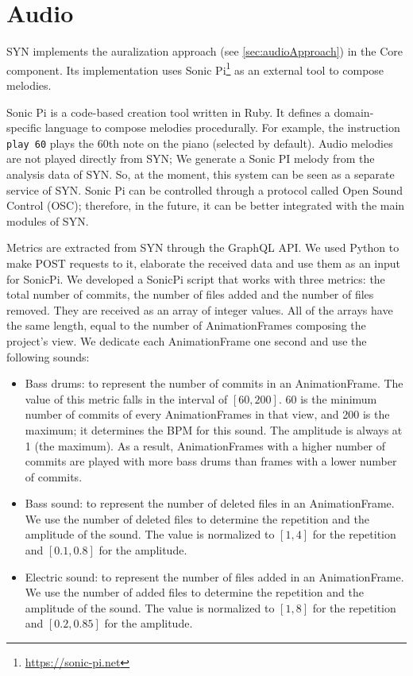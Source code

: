 \section{Audio}
SYN implements the auralization approach (see \autoref{sec:audioApproach}) in the Core component. 
Its implementation uses Sonic Pi\footnote{\url{https://sonic-pi.net}} as an external tool to compose melodies.

Sonic Pi is a code-based creation tool written in Ruby. It defines a domain-specific language to compose melodies procedurally. For example, the instruction \texttt{play 60} plays the 60th note on the piano (selected by default). Audio melodies are not played directly from SYN; We generate a Sonic PI melody from the analysis data of SYN. So, at the moment, this system can be seen as a separate service of SYN. Sonic Pi can be controlled through a protocol called Open Sound Control (OSC); therefore, in the future, it can be better integrated with the main modules of SYN. 

Metrics are extracted from SYN through the GraphQL API. We used Python to make POST requests to it, elaborate the received data and use them as an input for SonicPi. We developed a SonicPi script that works with three metrics: the total number of commits, the number of files added and the number of files removed. They are received as an array of integer values. All of the arrays have the same length, equal to the number of AnimationFrames composing the project's view. We dedicate each AnimationFrame one second and use the following sounds:

\begin{itemize}
    \item Bass drums: to represent the number of commits in an AnimationFrame. The value of this metric falls in the interval of $\left[60,200\right]$. 60 is the minimum number of commits of every AnimationFrames in that view, and 200 is the maximum; it determines the BPM for this sound. The amplitude is always at 1 (the maximum). As a result, AnimationFrames with a higher number of commits are played with more bass drums than frames with a lower number of commits.
    \item Bass sound: to represent the number of deleted files in an AnimationFrame. We use the number of deleted files to determine the repetition and the amplitude of the sound. The value is normalized to $\left[1,4\right]$ for the repetition and $\left[0.1,0.8\right]$ for the amplitude.
    \item Electric sound: to represent the number of files added in an AnimationFrame.  We use the number of added files to determine the repetition and the amplitude of the sound. The value is normalized to $\left[1,8\right]$ for the repetition and $\left[0.2,0.85\right]$ for the amplitude.
\end{itemize}

